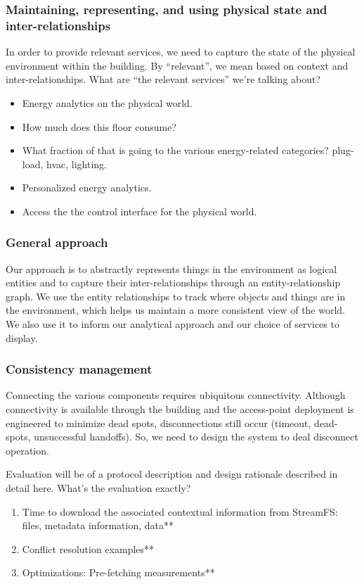 \subsubsection{Maintaining, representing, and using physical state and inter-relationships}
In order to provide relevant services, we need to capture the state of the physical environment within the building.  By “relevant”, we mean based on context and inter-relationships.  What are “the relevant services” we’re talking about?

\begin{itemize}
\item Energy analytics on the physical world.
\item How much does this floor consume?
\item What fraction of that is going to the various energy-related categories?  plug-load, hvac, lighting.
\item Personalized energy analytics.
\item Access the the control interface for the physical world.
\end{itemize}

\subsubsection{General approach}
Our approach is to abstractly represents things in the environment as logical entities and to capture their inter-relationships through an entity-relationship graph.  We use the entity relationships to track where objects and things are in the environment, which helps us maintain a more consistent view of the world.  We also use  it to inform our analytical approach and our choice of services to display.

\subsubsection{Consistency management}
Connecting the various components requires ubiquitous connectivity.  Although connectivity is available through the building and the access-point deployment is engineered to minimize dead spots, disconnections still occur (timeout, dead-spots, unsuccessful handoffs).  So, we need to design the system to deal disconnect operation.

Evaluation will be of a protocol description and design rationale described in detail here.
What’s the evaluation exactly?

\begin{enumerate}
\item Time to download the associated contextual information from StreamFS: files, metadata information, data**
\item Conflict resolution examples**
\item Optimizations: Pre-fetching measurements**
\end{enumerate}

